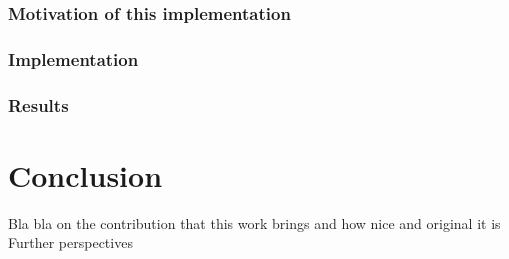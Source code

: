 \documentclass{article}
\begin{document}
    \subsubsection{Motivation of this implementation}

    \subsubsection{Implementation}

    \subsubsection{Results}


    \section{Conclusion}\label{sec:conclusion}
    Bla bla on the contribution that this work brings and how nice and original it is
    Further perspectives


    
    
\end{document}
